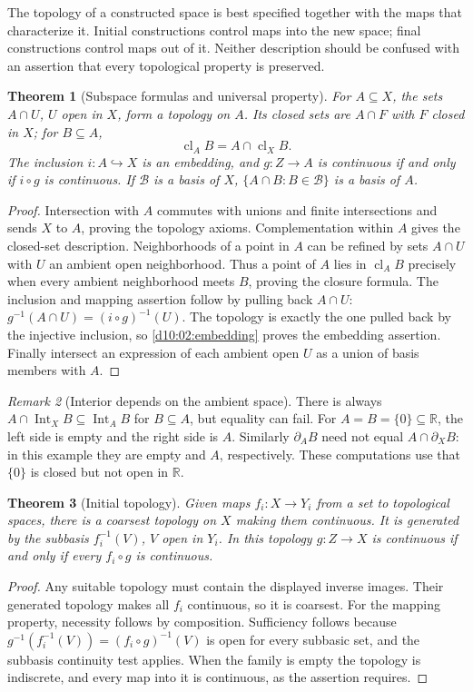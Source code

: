 \documentclass[11pt,oneside,openany]{book}
\newtheorem{theorem}{Theorem}[chapter]
\theoremstyle{definition}
\theoremstyle{remark}
\newtheorem{remark}[theorem]{Remark}
\newcommand{\R}{\mathbb R}\newcommand{\C}{\mathbb C}
\newcommand{\BB}{\mathcal B}\newcommand{\FF}{\mathcal F}
\DeclareMathOperator{\cl}{cl}
\DeclareMathOperator{\Int}{Int}
\begin{document}
The topology of a constructed space is best specified together with the maps that characterize it. Initial constructions control maps into the new space; final constructions control maps out of it. Neither description should be confused with an assertion that every topological property is preserved.

\begin{theorem}[Subspace formulas and universal property]\label{d10:03:subspace}
For $A\subseteq X$, the sets $A\cap U$, $U$ open in $X$, form a topology on $A$. Its closed sets are $A\cap F$ with $F$ closed in $X$; for $B\subseteq A$,
\[
 \cl_A B=A\cap\cl_X B.
\]
The inclusion $i:A\hookrightarrow X$ is an embedding, and $g:Z\to A$ is continuous if and only if $i\circ g$ is continuous. If $\BB$ is a basis of $X$, $\{A\cap B:B\in\BB\}$ is a basis of $A$.
\end{theorem}
\begin{proof}
Intersection with $A$ commutes with unions and finite intersections and sends $X$ to $A$, proving the topology axioms. Complementation within $A$ gives the closed-set description. Neighborhoods of a point in $A$ can be refined by sets $A\cap U$ with $U$ an ambient open neighborhood. Thus a point of $A$ lies in $\cl_A B$ precisely when every ambient neighborhood meets $B$, proving the closure formula. The inclusion and mapping assertion follow by pulling back $A\cap U$: $g^{-1}(A\cap U)=(i\circ g)^{-1}(U)$. The topology is exactly the one pulled back by the injective inclusion, so \cref{d10:02:embedding} proves the embedding assertion. Finally intersect an expression of each ambient open $U$ as a union of basis members with $A$.
\end{proof}

\begin{remark}[Interior depends on the ambient space]\label{d10:03:interior-caution}
There is always $A\cap\Int_X B\subseteq\Int_A B$ for $B\subseteq A$, but equality can fail. For $A=B=\{0\}\subseteq\R$, the left side is empty and the right side is $A$. Similarly $\partial_A B$ need not equal $A\cap\partial_X B$: in this example they are empty and $A$, respectively. These computations use that $\{0\}$ is closed but not open in $\R$.
\end{remark}

\begin{theorem}[Initial topology]\label{d10:03:initial}
Given maps $f_i:X\to Y_i$ from a set to topological spaces, there is a coarsest topology on $X$ making them continuous. It is generated by the subbasis $f_i^{-1}(V)$, $V$ open in $Y_i$. In this topology $g:Z\to X$ is continuous if and only if every $f_i\circ g$ is continuous.
\end{theorem}
\begin{proof}
Any suitable topology must contain the displayed inverse images. Their generated topology makes all $f_i$ continuous, so it is coarsest. For the mapping property, necessity follows by composition. Sufficiency follows because $g^{-1}(f_i^{-1}(V))=(f_i\circ g)^{-1}(V)$ is open for every subbasic set, and the subbasis continuity test applies. When the family is empty the topology is indiscrete, and every map into it is continuous, as the assertion requires.
\end{proof}
\end{document}
